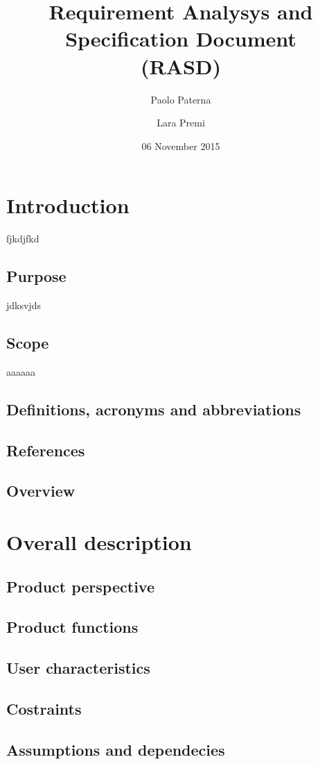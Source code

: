 \documentclass[12pt,a4paper]{article}
\begin{document}
	\title{Requirement Analysys and Specification Document\\
		(RASD)}
	\author{Paolo Paterna \and Lara Premi}
	\date{06 November 2015}
	\maketitle
	\newpage
	\tableofcontents
	\newpage
	
	\section{Introduction}
	fjkdjfkd
	\subsection{Purpose}
	jdksvjds
	\subsection{Scope}
	aaaaaa
	\subsection{Definitions, acronyms and abbreviations}
	\subsection{References}
	\subsection{Overview}
	\section{Overall description}
	\subsection{Product perspective}
	\subsection{Product functions}
	\subsection{User characteristics}
	\subsection{Costraints}
	\subsection{Assumptions and dependecies}
\end{document}
